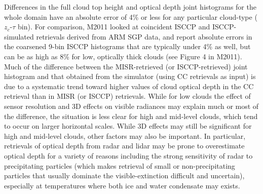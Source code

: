 Differences in the full cloud top height and optical depth joint
histograms for the whole domain have an absolute error of 4\% or less
for any particular cloud-type (\(z_c\)-\(\tau\) bin). For comparison,
M2011 looked at coincident ISCCP and ISCCP-simulated retrievals derived
from ARM SGP data, and report absolute errors in the coarsened 9-bin
ISCCP histograms that are typically under 4\% as well, but can be as
high as 8\% for low, optically thick clouds (see Figure 4 in M2011).
Much of the difference between the MISR-retrieved (or ISCCP-retrieved)
joint histogram and that obtained from the simulator (using CC
retrievals as input) is due to a systematic trend toward higher values
of cloud optical depth in the CC retrieval than in MISR (or ISCCP)
retrievals. While for low clouds the effect of sensor resolution and 3D
effects on visible radiances may explain much or most of the difference,
the situation is less clear for high and mid-level clouds, which tend to
occur on larger horizontal scales. While 3D effects may still be
significant for high and mid-level clouds, other factors may also be
important. In particular, retrievals of optical depth from radar and
lidar may be prone to overestimate optical depth for a variety of
reasons including the strong sensitivity of radar to precipitating
particles (which makes retrieval of small or non-precipitating particles
that usually dominate the visible-extinction difficult and uncertain),
especially at temperatures where both ice and water condensate may
exists.
